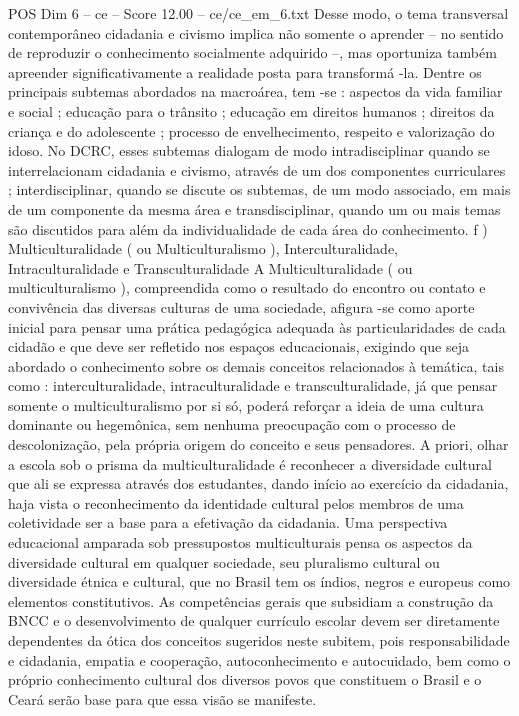 \begin{textsample}{POS Dim 6 – ce – Score 12.00 – ce/ce\_em\_6.txt}
Desse modo, o tema transversal contemporâneo cidadania e civismo implica não somente o aprender – no sentido de reproduzir o conhecimento socialmente adquirido –, mas oportuniza também apreender significativamente a realidade posta para transformá -la.
Dentre os principais subtemas abordados na macroárea, tem -se : aspectos da vida familiar e social ; educação para o trânsito ; educação em direitos humanos ; direitos da criança e do adolescente ; processo de envelhecimento, respeito e valorização do idoso.
No DCRC, esses subtemas dialogam de modo intradisciplinar quando se interrelacionam cidadania e civismo, através de um dos componentes curriculares ; interdisciplinar, quando se discute os subtemas, de um modo associado, em mais de um componente da mesma área e transdisciplinar, quando um ou mais temas são discutidos para além da individualidade de cada área do conhecimento. f ) Multiculturalidade ( ou Multiculturalismo ), Interculturalidade, Intraculturalidade e Transculturalidade A Multiculturalidade ( ou multiculturalismo ), compreendida como o resultado do encontro ou contato e convivência das diversas culturas de uma sociedade, afigura -se como aporte inicial para pensar uma prática pedagógica adequada às particularidades de cada cidadão e que deve ser refletido nos espaços educacionais, exigindo que seja abordado o conhecimento sobre os demais conceitos relacionados à temática, tais como : interculturalidade, intraculturalidade e transculturalidade, já que pensar somente o multiculturalismo por si só, poderá reforçar a ideia de uma cultura dominante ou hegemônica, sem nenhuma preocupação com o processo de descolonização, pela própria origem do conceito e seus pensadores.
A priori, olhar a escola sob o prisma da multiculturalidade é reconhecer a diversidade cultural que ali se expressa através dos estudantes, dando início ao exercício da cidadania, haja vista o reconhecimento da identidade cultural pelos membros de uma coletividade ser a base para a efetivação da cidadania.
Uma perspectiva educacional amparada sob pressupostos multiculturais pensa os aspectos da diversidade cultural em qualquer sociedade, seu pluralismo cultural ou diversidade étnica e cultural, que no Brasil tem os índios, negros e europeus como elementos constitutivos.
As competências gerais que subsidiam a construção da BNCC e o desenvolvimento de qualquer currículo escolar devem ser diretamente dependentes da ótica dos conceitos sugeridos neste subitem, pois responsabilidade e cidadania, empatia e cooperação, autoconhecimento e autocuidado, bem como o próprio conhecimento cultural dos diversos povos que constituem o Brasil e o Ceará serão base para que essa visão se manifeste.

\end{textsample}
